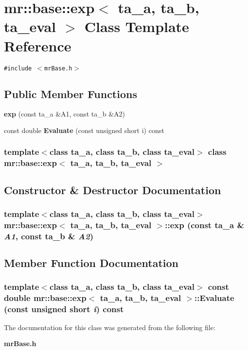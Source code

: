 \section{mr::base::exp$<$ ta\_\-a, ta\_\-b, ta\_\-eval $>$ Class Template Reference}
\label{classmr_1_1base_1_1exp}
{\tt \#include $<$mr\-Base.h$>$}

\subsection*{Public Member Functions}
\begin{CompactItemize}
\item 
{\bf exp} (const ta\_\-a \&A1, const ta\_\-b \&A2)
\item 
const double {\bf Evaluate} (const unsigned short i) const 
\end{CompactItemize}
\subsubsection*{template$<$class ta\_\-a, class ta\_\-b, class ta\_\-eval$>$ class mr::base::exp$<$ ta\_\-a, ta\_\-b, ta\_\-eval $>$}



\subsection{Constructor \& Destructor Documentation}
\subsubsection{\setlength{\rightskip}{0pt plus 5cm}template$<$class ta\_\-a, class ta\_\-b, class ta\_\-eval$>$ {\bf mr::base::exp}$<$ ta\_\-a, ta\_\-b, ta\_\-eval $>$::{\bf exp} (const ta\_\-a \& {\em A1}, const ta\_\-b \& {\em A2})\hspace{0.3cm}{\tt  [inline]}}\label{classmr_1_1base_1_1exp_a0}




\subsection{Member Function Documentation}
\subsubsection{\setlength{\rightskip}{0pt plus 5cm}template$<$class ta\_\-a, class ta\_\-b, class ta\_\-eval$>$ const double {\bf mr::base::exp}$<$ ta\_\-a, ta\_\-b, ta\_\-eval $>$::Evaluate (const unsigned short {\em i}) const\hspace{0.3cm}{\tt  [inline]}}\label{classmr_1_1base_1_1exp_a1}




The documentation for this class was generated from the following file:\begin{CompactItemize}
\item 
{\bf mr\-Base.h}\end{CompactItemize}
